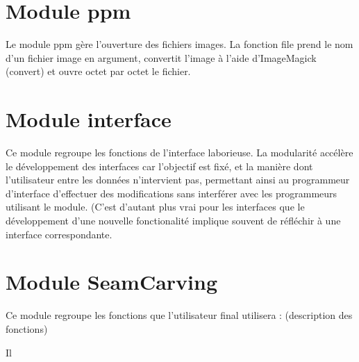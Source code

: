 \documentclass[a4paper]{article}
\begin{document}
\section{Module ppm}

Le module ppm gère l'ouverture des fichiers images. La fonction file 
prend le nom d'un fichier image en argument, convertit l'image à l'aide
d'ImageMagick (convert) et ouvre octet par octet le fichier.


\section {Module interface}

Ce module regroupe les fonctions de l'interface laborieuse. La modularité
accélère le développement des interfaces car l'objectif est fixé, et la 
manière dont l'utilisateur entre les données n'intervient pas, permettant 
ainsi au programmeur d'interface d'effectuer des modifications sans 
interférer avec les programmeurs utilisant le module. (C'est d'autant plus
vrai pour les interfaces que le développement d'une nouvelle fonctionalité
implique souvent de réfléchir à une interface correspondante.

\section {Module SeamCarving}

Ce module regroupe les fonctions que l'utilisateur final utilisera :
(description des fonctions)

Il
\end{document}
